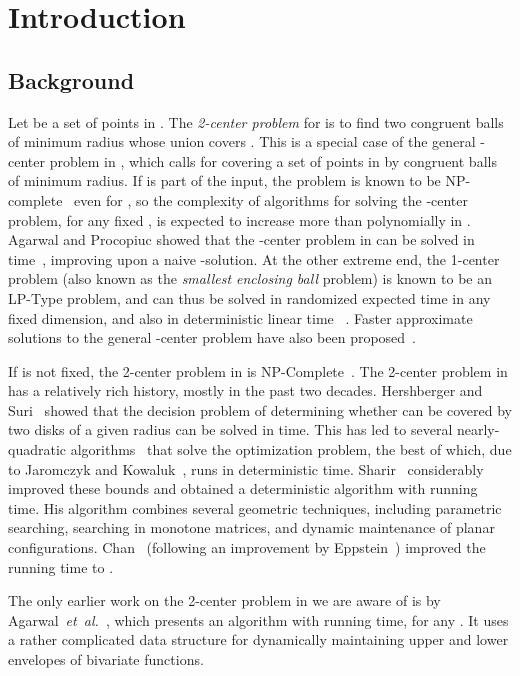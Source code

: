\documentclass[a4paper,12pt]{article}
\def\etal{\textsl{et~al.}}
\begin{document}
\section{Introduction}
\label{sec:introduction}

\subsection{Background}
\label{subsec:background} Let  be a set of
 points in . The \emph{2-center problem} for  is to
find two congruent balls of minimum radius whose union covers .
This is a special case of the general -center problem in
, which calls for covering a set  of  points in
 by  congruent balls of minimum radius. If  is
part of the input, the problem is known to be NP-complete~\cite{MK}
even for , so the complexity of algorithms for solving the
-center problem, for any fixed , is expected to increase more
than polynomially in . Agarwal and Procopiuc showed that the
-center problem in  can be solved in 
time~\cite{AP}, improving upon a naive -solution. At the
other extreme end, the 1-center problem (also known as the
\emph{smallest enclosing ball} problem) is known to be an LP-Type
problem, and can thus be solved in  randomized expected time
in any fixed dimension, and also in deterministic linear time
~\cite{CM, NML, NMLT}. Faster approximate solutions to the general
-center problem have also been proposed~\cite{AP, BHI, BE}.

If  is not fixed, the 2-center problem in  is
NP-Complete~\cite{MK2}. The 2-center problem in  has a
relatively rich history, mostly in the past two decades. Hershberger
and Suri~\cite{HS} showed that the decision problem of determining
whether  can be covered by two disks of a given radius  can be
solved in  time. This has led to several
nearly-quadratic algorithms~\cite{ASP, DE, JK} that solve the
optimization problem, the best of which, due to Jaromczyk and
Kowaluk~\cite{JK}, runs in  deterministic time.
Sharir~\cite{MS} considerably improved these bounds and obtained a
deterministic algorithm with  running time. His
algorithm combines several geometric techniques, including
parametric searching, searching in monotone matrices, and dynamic
maintenance of planar configurations. Chan~\cite{TC} (following an
improvement by Eppstein~\cite{DEF}) improved the running time to
.

The only earlier work on the 2-center problem in  we are aware of is by Agarwal~\etal~\cite{AES},
which presents an algorithm with  running time, for any . It uses
a rather complicated data structure for dynamically maintaining upper and lower envelopes of bivariate functions.
\end{document}
